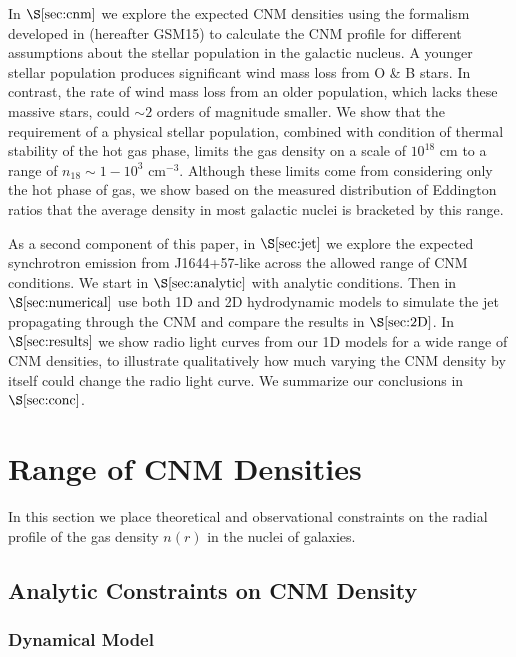 \documentclass[usenatbib,fleqn]{mnras}
\begin{document}
In $\S\ref{sec:cnm}$ we explore the expected CNM densities using the
formalism developed in \citet{Generozov+2015} (hereafter GSM15) to
calculate the CNM profile for different assumptions about the stellar
population in the galactic nucleus.  A younger stellar population
produces significant wind mass loss from O \& B stars. In contrast,
the rate of wind mass loss from an older population, which lacks these
massive stars, could $\sim 2$ orders of magnitude smaller.  We show
that the requirement of a physical stellar population, combined with
condition of thermal stability of the hot gas phase, limits the gas
density on a scale of $10^{18}$ cm to a range of $n_{18} \sim
1-10^{3}$ cm$^{-3}$.  Although these limits come from considering
only the hot phase of gas, we show based on the measured distribution
of Eddington ratios that the average density in most galactic nuclei
is bracketed by this range. 

As a second component of this paper, in $\S\ref{sec:jet}$ we
explore the expected synchrotron emission from J1644+57-like across
the allowed range of CNM conditions.  We start in
$\S\ref{sec:analytic}$ with analytic conditions.  Then in
$\S\ref{sec:numerical}$ use both 1D and 2D hydrodynamic models to
simulate the jet propagating through the CNM and compare the results
in $\S\ref{sec:2D}$. In $\S\ref{sec:results}$ we show radio
light curves from our 1D models for a wide range of CNM densities, to
illustrate qualitatively how much varying the CNM density by itself
could change the radio light curve.  We summarize our conclusions in
$\S\ref{sec:conc}$.

\section{Range of CNM Densities}
\label{sec:cnm}

In this section we place theoretical and observational constraints on
the radial profile of the gas density $n(r)$ in the nuclei of
galaxies. 

\subsection{Analytic Constraints on CNM Density}

\subsubsection{Dynamical Model}
\label{sec:model}
\end{document}
